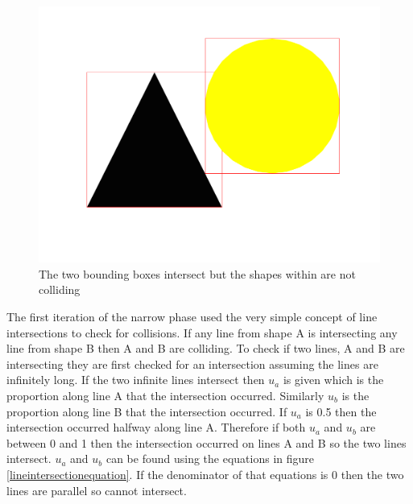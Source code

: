 \documentclass[]{report}
\begin{document}
			\begin{figure}[H]
				\centering
				\includegraphics[scale=0.25]{bbnocollision}
				\caption{The two bounding boxes intersect but the shapes within are not colliding}
				\label{bbnocollision}
			\end{figure}
			
			The first iteration of the narrow phase used the very simple concept of line intersections to check for collisions. If any line from shape A is intersecting any line from shape B then A and B are colliding. To check if two lines, A and B are intersecting they are first checked for an intersection assuming the lines are infinitely long. If the two infinite lines intersect then $u_{a}$ is given which is the proportion along line A that the intersection occurred. Similarly $u_{b}$ is the proportion along line B that the intersection occurred. If $u_{a}$ is 0.5 then the intersection occurred halfway along line A. Therefore if both $u_{a}$ and $u_{b}$ are between 0 and 1 then the intersection occurred on lines A and B so the two lines intersect. $u_{a}$ and $u_{b}$ can be found using the equations in figure \ref{lineintersectionequation}. If the denominator of that equations is 0 then the two lines are parallel so cannot intersect.
			
\end{document}
